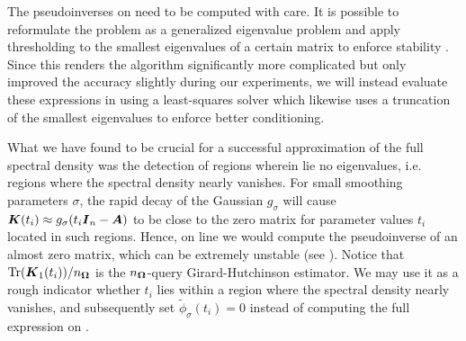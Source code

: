 \documentclass[12pt]{article}
\begin{document}



The pseudoinverses on  need to be computed with care. It is possible to reformulate the problem as a generalized eigenvalue problem and apply thresholding to the smallest eigenvalues of a certain matrix to enforce stability \cite{lin-2017-randomized-estimation, epperly-2022-theory-quantuma}. Since this renders the algorithm significantly more complicated but only improved the accuracy slightly during our experiments, we will instead evaluate these expressions in  using a least-squares solver which likewise uses a truncation of the smallest eigenvalues to enforce better conditioning.

What we have found to be crucial for a successful approximation of the full spectral density was the detection of regions wherein lie no eigenvalues, i.e. regions where the spectral density nearly vanishes. For small smoothing parameters $\sigma$, the rapid decay of the Gaussian $g_{\sigma}$ will cause $\boldsymbol{K}(t_i) \approx g_{\sigma}(t_i\boldsymbol{I}_n - \boldsymbol{A})$ to be close to the zero matrix for parameter values $t_i$ located in such regions. Hence, on line  we would compute the pseudoinverse of an almost zero matrix, which can be extremely unstable (see ). Notice that $\operatorname{Tr}(\boldsymbol{K}_1(t_i)) / n_{\boldsymbol{\Omega}}$ is the $n_{\boldsymbol{\Omega}}$-query Girard-Hutchinson estimator. We may use it as a rough indicator whether $t_i$ lies within a region where the spectral density nearly vanishes, and subsequently set $\widetilde{\phi}_{\sigma}(t_i) = 0$ instead of computing the full expression on .
\end{document}
